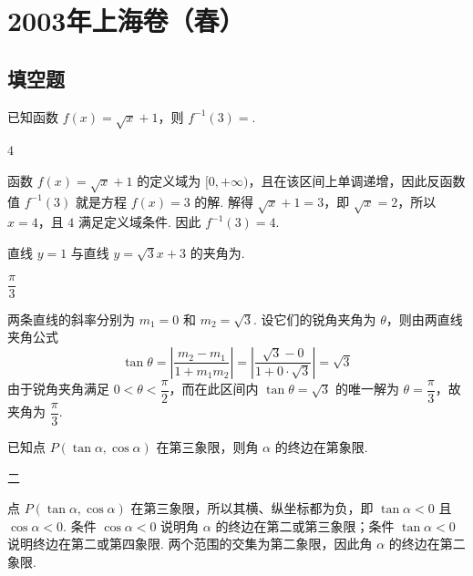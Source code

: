\chapter{2003年上海卷（春）}
\section{填空题}
\begin{problem}
已知函数 \( f(x) = \sqrt{x} + 1 \)，则 \( f^{-1}(3) = \)\fillinblank{}.
\end{problem}

\begin{answer}
\(4\)
\end{answer}

\begin{solution}
函数 \(f(x)=\sqrt{x}+1\) 的定义域为 \([0,+\infty)\)，且在该区间上单调递增，因此反函数值 \(f^{-1}(3)\) 就是方程 \(f(x)=3\) 的解. 解得 \(\sqrt{x}+1=3\)，即 \(\sqrt{x}=2\)，所以 \(x=4\)，且 \(4\) 满足定义域条件. 因此 \(f^{-1}(3)=4\).
\end{solution}

\begin{problem}
直线 \( y = 1 \) 与直线 \( y = \sqrt{3}x + 3 \) 的夹角为\fillinblank{}.
\end{problem}

\begin{answer}
\(\dfrac{\pi}{3}\)
\end{answer}

\begin{solution}
两条直线的斜率分别为 \(m_1=0\) 和 \(m_2=\sqrt{3}\). 设它们的锐角夹角为 \(\theta\)，则由两直线夹角公式
\[
\tan\theta=\left|\frac{m_2-m_1}{1+m_1m_2}\right|=\left|\frac{\sqrt{3}-0}{1+0\cdot\sqrt{3}}\right|=\sqrt{3}
\]
由于锐角夹角满足 \(0<\theta<\dfrac{\pi}{2}\)，而在此区间内 \(\tan\theta=\sqrt{3}\) 的唯一解为 \(\theta=\dfrac{\pi}{3}\)，故夹角为 \(\dfrac{\pi}{3}\).
\end{solution}

\begin{problem}
已知点 \(P(\tan \alpha,\cos \alpha)\) 在第三象限，则角 \(\alpha\) 的终边在第\fillinblank{}象限.
\end{problem}

\begin{answer}
二
\end{answer}

\begin{solution}
点 \(P(\tan\alpha,\cos\alpha)\) 在第三象限，所以其横、纵坐标都为负，即 \(\tan\alpha<0\) 且 \(\cos\alpha<0\). 条件 \(\cos\alpha<0\) 说明角 \(\alpha\) 的终边在第二或第三象限；条件 \(\tan\alpha<0\) 说明终边在第二或第四象限. 两个范围的交集为第二象限，因此角 \(\alpha\) 的终边在第二象限.
\end{solution}

